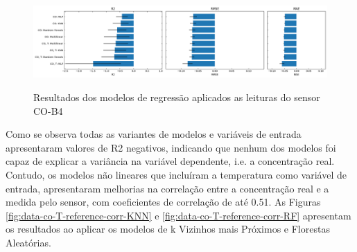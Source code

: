 \begin{figure}[h]
    \centering
    \caption{Resultados dos modelos de regressão aplicados as leituras do sensor CO-B4}
    \includegraphics[width=\textwidth]{chapters/4-CALIBRAÇÃO MÚLTIPLOS SENSORES/Figuras/co-b4-models-performance.png}
    \label{fig:data-co-b4-models-performance}
\end{figure}

Como se observa todas as variantes de modelos e variáveis de entrada apresentaram valores de R2 negativos, indicando que nenhum dos modelos foi capaz de explicar a variância na variável dependente, i.e. a concentração real. Contudo, os modelos não lineares que incluíram a temperatura como variável de entrada, apresentaram melhorias na correlação entre a concentração real e a medida pelo sensor, com coeficientes de correlação de até 0.51. As Figuras \ref{fig:data-co-T-reference-corr-KNN} e \ref{fig:data-co-T-reference-corr-RF} apresentam os resultados ao aplicar os modelos de k Vizinhos mais Próximos e Florestas Aleatórias.

